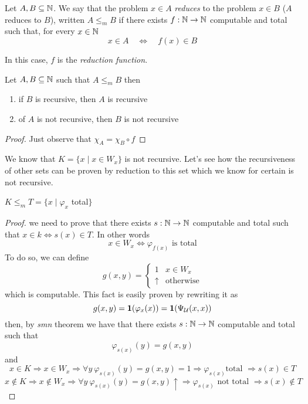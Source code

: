 \newcommand{\red}{\ensuremath{\leq_m}}
\begin{definition}
  Let $A,B \subseteq \mathbb{N}$. We say that the problem $x \in A$
  \emph{reduces} to the problem $x \in B$ ($A$ reduces to $B$), 
  written $A \red B$ if there exists
  $f : \mathbb{N} \to \mathbb{N}$ computable and total such that, for every $x \in \mathbb{N}$
  \[x \in A \quad  \Leftrightarrow \quad f(x) \in B\]
\end{definition}
In this case, $f$ is the \emph{reduction function}.

\begin{observation}
  Let $A,B \subseteq \mathbb{N}$ such that $A \red B$ then
\begin{enumerate}[label=\arabic*]
\item if $B$ is recursive, then $A$ is recursive
\item of $A$ is not recursive, then $B$ is not recursive
\end{enumerate}

\begin{proof}
Just observe that $\chi_A = \chi_B \circ f$
\end{proof}
\end{observation}

We know that $K = \{ x \mid x \in W_x \}$ is not recursive. Let's see how
the recursiveness of other sets can be proven by reduction to this
set which we know for certain is not recursive.
\begin{example}
  $K \red T = \{x \mid \varphi_x $ total$ \}$
  \begin{proof}
    we need to prove that there exists $s : \mathbb{N} \to \mathbb{N}$ computable and total
    such that $x \in k \Leftrightarrow s(x) \in T$. In other words
    \[ x\in W_x \Leftrightarrow  \varphi_{f(x)} \mbox{ is total} \]
    To do so, we can define
    \[
      g(x,y) = \begin{cases}
        1 & x\in W_x \\
        \uparrow & \mbox{otherwise}
      \end{cases}
    \]
    which is computable. This fact is easily proven by rewriting it as
    \[
      g(x,y) = \mathbf{1}(\varphi_x(x)) = \mathbf{1}(\Psi_{\mathcal{U}}(x,x))
    \]
    then, by \emph{smn} theorem we have that there exists $s: \mathbb{N} \to \mathbb{N}$
    computable and total such that 
    \[\varphi_{s(x)}(y) = g(x,y)\] and 
    \[x \in K \Rightarrow x \in W_x \Rightarrow \forall y\
      \varphi_{s(x)}(y) = g(x,y) = 1 \Rightarrow \varphi_{s(x)} \mbox{
        total } \Rightarrow s(x) \in T\]
    \[x \notin K \Rightarrow x \notin W_x \Rightarrow \forall y\
      \varphi_{s(x)}(y) = g(x,y) \uparrow \Rightarrow \varphi_{s(x)}
      \mbox{ not total } \Rightarrow s(x) \notin T\]
  \end{proof}
\end{example}

